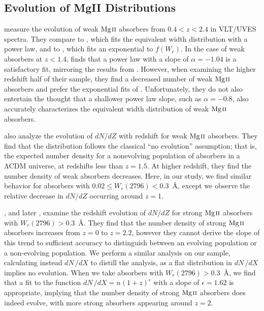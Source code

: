 \documentclass[iop,apj,numberedappendix,appendixfloats,twocolappendix]{emulateapj}
\begin{document}
\subsection{Evolution of MgII Distributions}

\cite{Narayanan2007} measure the evolution of weak ${\hbox{{\rm Mg}\kern 0.1em{\sc ii}}}$ absorbers from $0.4 < z < 2.4$ in VLT/UVES spectra. They compare to \cite{Churchill1999}, which fits the equivalent width distribution with a power law, and to \cite{Nestor2005}, which fits an exponential to $f(W_r)$. In the case of weak absorbers at $z < 1.4$, \cite{Narayanan2007} finds that a power law with a slope of $\alpha = -1.04$ is a satisfactory fit, mirroring the results from \cite{Churchill1999}. However, when examining the higher redshift half of their sample, they find a decreased number of weak ${\hbox{{\rm Mg}\kern 0.1em{\sc ii}}}$ absorbers and prefer the exponential fits of \cite{Nestor2005}. Unfortunately, they do not also entertain the thought that a shallower power law slope, such as $\alpha = -0.8$, also accurately characterizes the equivalent width distribution of weak ${\hbox{{\rm Mg}\kern 0.1em{\sc ii}}}$ absorbers. 

\cite{Narayanan2007} also analyze the evolution of $dN\!/dZ$ with redshift for weak ${\hbox{{\rm Mg}\kern 0.1em{\sc ii}}}$ absorbers. They find that the distribution follows the classical ``no evolution'' assumption; that is, the expected number density for a nonevolving population of absorbers in a $\mathrm{\Lambda CDM}$ universe, at redshifts less than $z = 1.5$. At higher redshift, they find the number density of weak absorbers decreases. Here, in our study, we find similar behavior for absorbers with $0.02 \le W_r(2796) < 0.3$~{\AA}, except we observe the relative decrease in $dN\!/dZ$ occurring around $z = 1$.

\cite{Steidel1992}, and later \cite{Churchill2001}, examine the redshift evolution of $dN\!/dZ$ for strong ${\hbox{{\rm Mg}\kern 0.1em{\sc ii}}}$ absorbers with $W_r(2796) > 0.3$~{\AA}. They find that the number density of strong ${\hbox{{\rm Mg}\kern 0.1em{\sc ii}}}$ absorbers increases from $z = 0$ to $z = 2.2$, however they cannot derive the slope of this trend to sufficient accuracy to distinguish between an evolving population or a non-evolving population. We perform a similar analysis on our sample, calculating instead $dN\,/dX$ to distill the analysis, as a flat distribution in $dN\,/dX$ implies no evolution. When we take absorbers with $W_r(2796) > 0.3$~{\AA}, we find that a fit to the function $dN\,/dX = n(1+z)^{\epsilon}$ with a slope of $\epsilon = 1.62$ is appropriate, implying that the number density of strong ${\hbox{{\rm Mg}\kern 0.1em{\sc ii}}}$ absorbers does indeed evolve, with more strong absorbers appearing around $z = 2$.
\end{document}
